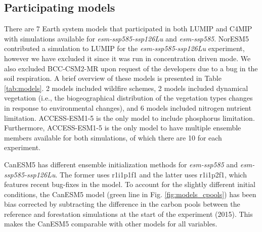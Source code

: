 \documentclass[]{article}
\begin{document}
\subsection{Participating models}

There are 7 Earth system models that participated in both LUMIP and C4MIP with simulations available for \textit{esm-ssp585-ssp126Lu} and \textit{esm-ssp585}.
NorESM5 contributed a simulation to LUMIP for the \textit{esm-ssp585-ssp126Lu} experiment, however we have excluded it since it was run in concentration driven mode.
We also excluded BCC-CSM2-MR upon request of the developers due to a bug in the soil respiration.
A brief overview of these models is presented in Table \ref{tab:models}.
2 models included wildfire schemes, 2 models included dynamical vegetation (i.e., the biogeographical distribution of the vegetation types changes in response to environmental changes), and 6 models included nitrogen nutrient limitation.
ACCESS-ESM1-5 is the only model to include phosphorus limitation.
Furthermore, ACCESS-ESM1-5 is the only model to have multiple ensemble members available for both simulations, of which there are 10 for each experiment.

CanESM5 has different ensemble initialization methods for \textit{esm-ssp585} and \textit{esm-ssp585-ssp126Lu}.
The former uses r1i1p1f1 and the latter uses r1i1p2f1, which features recent bug-fixes in the model.
To account for the slightly different initial conditions, the CanESM5 model (green line in Fig. \ref{fig:models_cpools}) has been bias corrected by subtracting the difference in the carbon pools between the reference and forestation simulations at the start of the experiment (2015).
This makes the CanESM5 comparable with other models for all variables.
\end{document}
